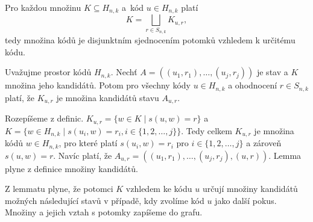 \begin{lemma}\label{lemmadisjunktnipotomci}
    Pro každou množinu $K \subseteq H_{n,k}$ a~kód $u \in H_{n,k}$ platí
    \[K = \bigsqcup_{r\in S_{n,k}} K_{u,r},\]
    tedy množina kódů je disjunktním sjednocením potomků vzhledem k určitému kódu.
\end{lemma}



\begin{lemma}\label{lemmavztahnaslednikuapotomku}
    Uvažujme prostor kódů $H_{n,k}$. Nechť $A = \left((u_1, r_1), \dots, (u_j,r_j)\right)$ je stav a $K$ množina jeho kandidátů. Potom pro všechny kódy $u\in H_{n,k}$ a ohodnocení $r \in S_{n,k}$ platí, že $K_{u,r}$ je množina kandidátů stavu $A_{u,r}$.
\end{lemma}
\begin{dukaz}
    Rozepíšeme z definic. 
    $K_{u,r} = \{w \in K \mid s(u,w) = r\}$ a $K = \{w \in H_{n,k} \mid s(u_i,w) = r_i,  i \in \{1,2,\dots ,j\} \}$. Tedy celkem 
    $K_{u,r}$ je množina kódů $w \in H_{n,k}$, pro které platí $s(u_i,w) = r_i$ pro $i \in \{1,2,\dots ,j\}$ a zároveň $s(u,w) = r$.
    Navíc platí, že $A_{u,r} = \left((u_1, r_1), \dots, (u_j,r_j), (u,r)\right)$. Lemma plyne z definice množiny kandidátů.
\end{dukaz}
Z lemmatu plyne, že potomci $K$ vzhledem ke kódu $u$ určují množiny kandidátů možných následující stavů v případě, kdy zvolíme kód $u$ jako další pokus. Množiny a jejich vztah s potomky zapíšeme do grafu. 

